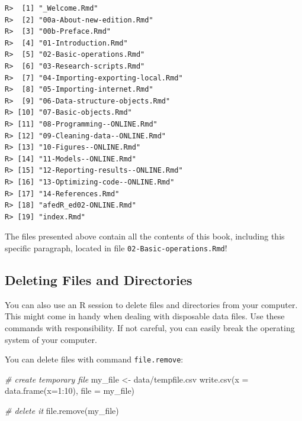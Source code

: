 \documentclass[
  12pt,
]{book}
\newenvironment{Shaded}{\begin{snugshade}}{\end{snugshade}}
\newcommand{\AttributeTok}[1]{\textcolor[rgb]{0.61,0.61,0.61}{#1}}
\newcommand{\CommentTok}[1]{\textcolor[rgb]{0.37,0.37,0.37}{\textit{#1}}}
\newcommand{\DecValTok}[1]{\textcolor[rgb]{0.06,0.06,0.06}{#1}}
\newcommand{\FunctionTok}[1]{\textcolor[rgb]{0,0,0}{#1}}
\newcommand{\NormalTok}[1]{#1}
\newcommand{\OtherTok}[1]{\textcolor[rgb]{0.37,0.37,0.37}{#1}}
\newcommand{\SpecialCharTok}[1]{\textcolor[rgb]{0,0,0}{#1}}
\newcommand{\StringTok}[1]{\textcolor[rgb]{0.5,0.5,0.5}{#1}}
\begin{document}
\begin{verbatim}
R>  [1] "_Welcome.Rmd"                    
R>  [2] "00a-About-new-edition.Rmd"       
R>  [3] "00b-Preface.Rmd"                 
R>  [4] "01-Introduction.Rmd"             
R>  [5] "02-Basic-operations.Rmd"         
R>  [6] "03-Research-scripts.Rmd"         
R>  [7] "04-Importing-exporting-local.Rmd"
R>  [8] "05-Importing-internet.Rmd"       
R>  [9] "06-Data-structure-objects.Rmd"   
R> [10] "07-Basic-objects.Rmd"            
R> [11] "08-Programming--ONLINE.Rmd"      
R> [12] "09-Cleaning-data--ONLINE.Rmd"    
R> [13] "10-Figures--ONLINE.Rmd"          
R> [14] "11-Models--ONLINE.Rmd"           
R> [15] "12-Reporting-results--ONLINE.Rmd"
R> [16] "13-Optimizing-code--ONLINE.Rmd"  
R> [17] "14-References.Rmd"               
R> [18] "afedR_ed02-ONLINE.Rmd"           
R> [19] "index.Rmd"
\end{verbatim}

The files presented above contain all the contents of this book, including this specific paragraph, located in file \texttt{02-Basic-operations.Rmd}!

\hypertarget{deleting-files-and-directories}{%
\subsection{Deleting Files and Directories}\label{deleting-files-and-directories}}

You can also use an R session to delete files and directories from your computer. This might come in handy when dealing with disposable data files. Use these commands with responsibility. If not careful, you can easily break the operating system of your computer.

You can delete files with command \texttt{file.remove}:

\begin{Shaded}
\begin{Highlighting}[]
\CommentTok{\# create temporary file}
\NormalTok{my\_file }\OtherTok{\textless{}{-}} \StringTok{\textquotesingle{}data/tempfile.csv\textquotesingle{}}
\FunctionTok{write.csv}\NormalTok{(}\AttributeTok{x =} \FunctionTok{data.frame}\NormalTok{(}\AttributeTok{x=}\DecValTok{1}\SpecialCharTok{:}\DecValTok{10}\NormalTok{),}
          \AttributeTok{file =}\NormalTok{ my\_file)}

\CommentTok{\# delete it}
\FunctionTok{file.remove}\NormalTok{(my\_file)}
\end{Highlighting}
\end{Shaded}
\end{document}
